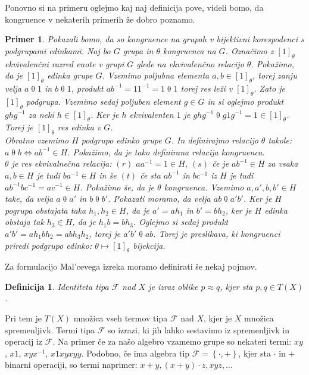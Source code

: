 \documentclass[a4paper,11pt]{article}
\newtheorem{definicija}{Definicija}
\newtheorem{primer}{Primer}
\begin{document}
Ponovno si na primeru oglejmo kaj naj definicija pove, videli bomo, da kongruence v nekaterih primerih že dobro poznamo.

\begin{primer}
 Pokazali bomo, da so kongruence na grupah v bijektivni korespodenci s podgrupami edinkami. 
 Naj bo $G$ grupa in $\theta$ kongruenca na $G$. Označimo z $\left[1\right]_{\theta}$ ekvivalenčni razred enote v grupi 
 $G$ glede na ekvivalenčno relacijo $\theta$. Pokažimo, da je $\left[1\right]_{\theta}$ edinka grupe $G$. Vzemimo 
 poljubna elementa $a, b \in \left[1\right]_{\theta}$, torej zanju velja $a \mathrel{\theta} 1$ in $b \mathrel{\theta} 1$, 
 produkt  $a b^{-1} = 1 1^{-1} = 1 \mathrel{\theta} 1$ torej res leži v $\left[1\right]_{\theta}$. Zato je 
 $\left[1\right]_{\theta}$ podgrupa. Vzemimo sedaj poljuben element $g \in G$ in si oglejmo produkt $g h g^{-1}$ za neki 
 $h \in  \left[1\right]_{\theta}$. Ker je $h$ ekvivalenten $1$ je $g h g^{-1} \mathrel{\theta} g 1 g^{-1} = 1 \in 
 \left[1\right]_{\theta}$. Torej je $\left[1\right]_{\theta}$ res edinka v $G$.\\
 Obratno vzemimo $H$ podgrupo edinko grupe $G$. In definirajmo relacijo $\theta$ takole: $a \mathrel{\theta} b 
 \Leftrightarrow a b^{-1} \in H$. Pokažimo, da je tako definirana relacija kongruenca.\\ 
 $\theta$ je res ekvivalnečna relacija: $(r)$ $aa^{-1}=
 1 \in H$, $(s)$ če je $ab^{-1} \in H$ za vsaka $a, b \in H$ je tudi $ba^{-1} \in H$ in še $(t)$ če sta $ab^{-1}$ in
 $bc^{-1}$ iz $H$ je tudi $ab^{-1} b c^{-1}= a c^{-1} \in H$. Pokažimo še, da je $\theta$ kongruenca. Vzemimo $a, a', 
 b, b'\in H$ take, da velja $a \mathrel{\theta} a'$ in $b \mathrel{\theta} b'$. Pokazati moramo, da velja $ab 
 \mathrel{\theta} a'b'$. Ker je $H$ pogrupa obstajata taka $h_1, h_2 \in H$, da je $a' = ah_1$ in $b' = b h_2$, 
 ker je $H$ edinka obstaja tak $h_3 \in H$, da je $h_1b = bh_3$. Oglejmo si sedaj produkt $a'b' = ah_1bh_2 = abh_3h_2$, 
 torej je $a'b' \mathrel{\theta} ab$. Torej je preslikava, ki kongruenci priredi podgrupo edinko: $\theta \mapsto 
 \left[1\right]_{\theta}$ bijekcija.

\end{primer}

Za formulacijo Mal'cevega izreka moramo definirati še nekaj pojmov. 
\begin{definicija}
    \emph{Identiteta} tipa $\mathcal{F}$ nad $X$ je izraz oblike $p \approx q$, kjer sta $p, q \in T\left(X\right)$.
\end{definicija}
Pri tem je $T\left(X\right)$ množica vseh termov tipa $\mathcal{F}$ nad $X$, kjer je $X$ množica spremenljivk. Termi 
tipa $\mathcal{F}$ so izrazi, ki jih lahko sestavimo iz spremenljivk in operacij iz $\mathcal{F}$. Na primer če za našo 
algebro vzamemo grupe so nekateri termi: $xy$, $x1$, $xyx^{-1}$, $x1xyxyy$. Podobno, če ima algebra tip $\mathcal{F} =
\left\{\cdot, +\right\}$, kjer sta $\cdot$ in $+$ binarni operaciji, so termi naprimer: $x+y, (x+y) \cdot z, xyz, \ldots$
\end{document}
